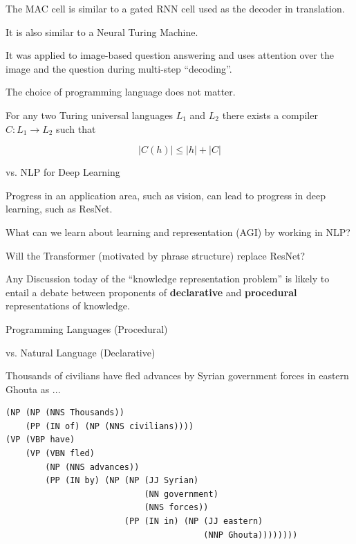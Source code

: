 {The MAC cell is similar to a gated RNN cell used as the decoder in translation.

\vfill
It is also similar to a Neural Turing Machine.

\vfill
It was applied to image-based question answering and uses attention over the image and the question during multi-step ``decoding''.


The choice of programming language does not matter.

\vfill
For any two Turing universal languages $L_1$ and $L_2$ there exists a compiler $C: L_1 \rightarrow L_2$ such that

$$|C(h)| \leq |h| + |C|$$

{vs. NLP for Deep Learning}

Progress in an application area, such as vision, can lead to progress in deep learning, such as ResNet.

\vfill
What can we learn about learning and representation (AGI) by working in NLP?

\vfill
Will the Transformer (motivated by phrase structure) replace ResNet?


Any Discussion today of the ``knowledge representation problem'' is likely to entail a debate between proponents of {\bf declarative} and {\bf procedural} representations of knowledge.

\vfill
{}

\vfill
Programming Languages (Procedural)

\vfill
vs. Natural Language (Declarative)


Thousands of civilians have fled advances by Syrian government forces in eastern Ghouta as ...

\begin{verbatim}
(NP (NP (NNS Thousands))
    (PP (IN of) (NP (NNS civilians))))
(VP (VBP have)
    (VP (VBN fled)
        (NP (NNS advances))
        (PP (IN by) (NP (NP (JJ Syrian)
                            (NN government)
                            (NNS forces))
                        (PP (IN in) (NP (JJ eastern)
                                        (NNP Ghouta))))))))
\end{verbatim}


}
